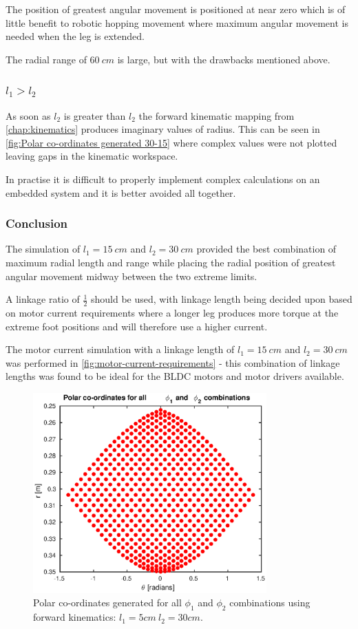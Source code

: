 The position of greatest angular movement is positioned at near zero which is of little benefit to robotic hopping movement where maximum angular movement is needed when the leg is extended.

The radial range of $60\ cm$ is large, but with the drawbacks mentioned above.

\subsubsection{$l_1>l_2$}
As soon as $l_2$ is greater than $l_2$ the forward kinematic mapping from \cref{chap:kinematics} produces imaginary values of radius. This can be seen in \cref{fig:Polar co-ordinates generated 30-15} where complex values were not plotted leaving gaps in the kinematic workspace. 

In practise it is difficult to properly implement complex calculations on an embedded system and it is better avoided all together. 

\subsubsection{Conclusion}
The simulation of $l_1=15\ cm$ and $l_2=30\ cm$ provided the best combination of maximum radial length and range while placing the radial position of greatest angular movement midway between the two extreme limits. 

A linkage ratio of $\frac{1}{2}$ should be used, with linkage length being decided upon based on motor current requirements where a longer leg produces more torque at the extreme foot positions and will therefore use a higher current. 

The motor current simulation with a linkage length of $l_1=15\ cm$ and $l_2=30\ cm$ was performed in \cref{fig:motor-current-requirements} - this combination of linkage lengths was found to be ideal for the BLDC motors and motor drivers available.

\begin{figure}
\centering
\includegraphics[width=0.8\textwidth]{images/geometry/forward-kinematic-leg-positions-5-30.eps}
\caption{Polar co-ordinates generated for all $\phi_1$ and $\phi_2$ combinations using forward kinematics: $l_1 = 5cm\ l_2 = 30cm$.}
\label{fig:Polar co-ordinates generated 5-30}
\end{figure}

